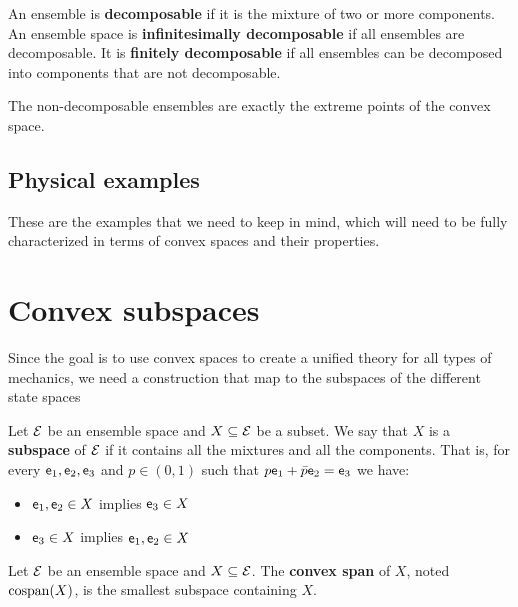 \begin{defn}
	An ensemble is \textbf{decomposable} if it is the mixture of two or more components. An ensemble space is \textbf{infinitesimally decomposable} if all ensembles are decomposable. It is \textbf{finitely decomposable} if all ensembles can be decomposed into components that are not decomposable.
\end{defn}

\begin{remark}
	The non-decomposable ensembles are exactly the extreme points of the convex space.
\end{remark}



\subsection{Physical examples}

These are the examples that we need to keep in mind, which will need to be fully characterized in terms of convex spaces and their properties.


\section{Convex subspaces}

Since the goal is to use convex spaces to create a unified theory for all types of mechanics, we need a construction that map to the subspaces of the different state spaces

\begin{defn}
	Let $\mathcal{E}$ be an ensemble space and $X \subseteq \mathcal{E}$ be a subset. We say that $X$ is a \textbf{subspace} of $\mathcal{E}$ if it contains all the mixtures and all the components. That is, for every $\mathsf{e}_1, \mathsf{e}_2, \mathsf{e}_3$ and $p \in (0,1)$ such that $p\mathsf{e}_1 + \bar{p} \mathsf{e}_2 = \mathsf{e}_3$ we have:
	\begin{itemize}
	\item $\mathsf{e}_1, \mathsf{e}_2 \in X$ implies $\mathsf{e}_3 \in X$
	\item $\mathsf{e}_3 \in X$ implies $\mathsf{e}_1, \mathsf{e}_2 \in X$
\end{itemize}
\end{defn}

\begin{defn}
	Let $\mathcal{E}$ be an ensemble space and $X \subseteq \mathcal{E}$.  The \textbf{convex span} of $X$, noted $\mathrm{cospan}(X)$, is the smallest subspace containing $X$.
\end{defn}

